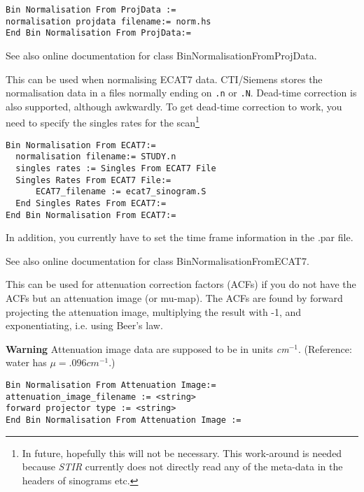 \documentclass{article}
\begin{document}
{ 
}
\begin{verbatim}
Bin Normalisation From ProjData :=
normalisation projdata filename:= norm.hs
End Bin Normalisation From ProjData:=
\end{verbatim}

See also online documentation for class BinNormalisationFromProjData.

{ 
}

This can be used when normalising ECAT7 data. CTI/Siemens stores
the normalisation data in a files normally ending on
\texttt{.n} or \texttt{.N}. Dead-time correction is also
supported, although awkwardly. To get dead-time correction
to work, you need to specify the singles rates for the 
scan\footnote{In future, hopefully this will not be necessary.
This work-around is needed because \textit{STIR} currently does not
directly read any of the meta-data in the headers of sinograms etc.}
{ 
}
\begin{verbatim}
Bin Normalisation From ECAT7:=
  normalisation filename:= STUDY.n
  singles rates := Singles From ECAT7 File
  Singles Rates From ECAT7 File:=
      ECAT7_filename := ecat7_sinogram.S
  End Singles Rates From ECAT7:=
End Bin Normalisation From ECAT7:=
\end{verbatim}

In addition, you currently have to set the time frame information in the .par file.

See also online documentation for class BinNormalisationFromECAT7.

{ 
}
\label{sec:binnormalisationfromattenuationimage}
This can be used for attenuation correction factors (ACFs) if 
you do not have the ACFs but an attenuation image (or mu-map). 
The ACFs are found by forward projecting the attenuation image, 
multiplying the result with -1, and exponentiating, i.e. using 
Beer's law.



\textbf{Warning} Attenuation image data are supposed to be in units \textit{cm}$^{-1}$. 
(Reference: water has $\mu=.096 \mathit{cm}^{-1}$.)

{ 
}
\begin{verbatim}
Bin Normalisation From Attenuation Image:=
attenuation_image_filename := <string>
forward projector type := <string>
End Bin Normalisation From Attenuation Image :=
\end{verbatim}
\end{document}
